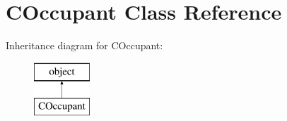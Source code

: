 \hypertarget{class_c_occupant_1_1_c_occupant}{}\section{C\+Occupant Class Reference}
\label{class_c_occupant_1_1_c_occupant}
Inheritance diagram for C\+Occupant\+:\begin{figure}[H]
\begin{center}
\leavevmode
\includegraphics[height=2.000000cm]{class_c_occupant_1_1_c_occupant}
\end{center}
\end{figure}

